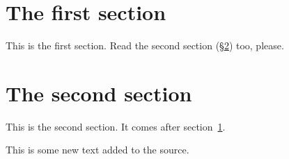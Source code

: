 \documentclass{article}
\begin{document}
\section{The first section}
\label{sec:first}
This is the first section. Read the second section (\S\ref{sec:second}) too, please.

\section{The second section}
\label{sec:second}
This is the second section. It comes after section~\ref{sec:first}.

This is some new text added to the source.
\end{document}
